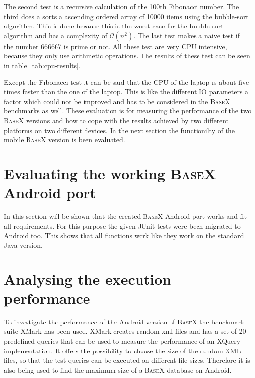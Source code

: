 The second test is a recursive calculation of the 100th Fibonacci number.
The third does a sorts a ascending ordered array of 10000 items using the bubble-sort algorithm.
This is done because this is the worst case for the bubble-sort algorithm and has a complexity of $\mathcal O(n^2)$.
The last test makes a naive test if the number 666667 is prime or not.
All these test are very CPU intensive, because they only use arithmetic operations.
The results of these test can be seen in table~\ref{tab:cpu-results}.

Except the Fibonacci test it can be said that the CPU of the laptop is about five times faster than the one of the laptop.
This is like the different IO parameters a factor which could not be improved and has to be considered in the \textsc{BaseX} benchmarks as well.
These evaluation is for measuring the performance of the two \textsc{BaseX} versions and how to cope with the results achieved by two different platforms on two different devices.
In the next section the functionilty of the mobile \textsc{BaseX} version is been evaluated.



\section{Evaluating the working \textsc{BaseX} Android port}
\label{sec:evaluating-the-working-basex-android-port}
In this section will be shown that the created \textsc{BaseX} Android port works and fit all requirements.
For this purpose the given JUnit tests were been migrated to Android too.
This shows that all functions work like they work on the standard Java version.


\section{Analysing the execution performance}
\label{sec:analysing-the-execution-performance}
To investigate the performance of the Android version of \textsc{BaseX} the benchmark suite XMark has been used.
XMark creates random xml files and has a set of 20 predefined queries that can be used to measure the performance of an XQuery implementation.
It offers the possibility to choose the size of the random XML files, so that the test queries can be executed on different file sizes.
Therefore it is also being used to find the maximum size of a \textsc{BaseX} database on Android.

